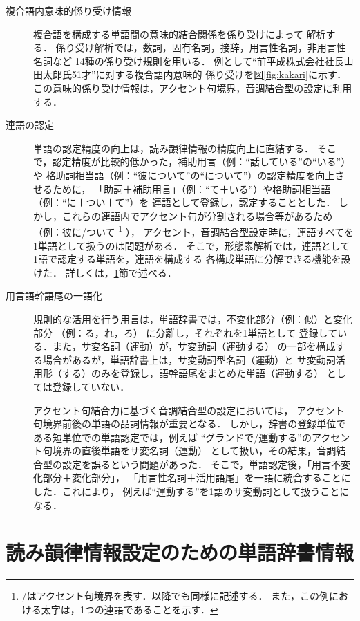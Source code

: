 \begin{description}
\item[複合語内意味的係り受け情報]
複合語を構成する単語間の意味的結合関係を係り受けによって
解析する\cite{Miyazaki2}．
係り受け解析では，数詞，固有名詞，接辞，用言性名詞，非用言性名詞など
14種の係り受け規則を用いる．
例として``前平成株式会社社長山田太郎氏51才''に対する複合語内意味的
係り受けを図\ref{fig:kakari}に示す．
この意味的係り受け情報は，アクセント句境界，音調結合型の設定に利用する．
\item[連語の認定]
単語の認定精度の向上は，読み韻律情報の精度向上に直結する．
そこで，認定\mbox{精度が比較的低かった，補助用言（例：``話している''の``いる''）や}
格助詞相当語（例：``彼について''の``について''）の認定精度を向上させるために，
「助詞＋補助用言」（例：``て＋いる''）や格助詞相当語（例：``に＋つい＋て''）を
連語として登録し，認定することとした．
しかし，これらの連語内でアクセント句が分割される場合等があるため
（例：彼{\dg に}/{\dg ついて}
\footnote{/はアクセント句境界を表す．以降でも同様に記述する．
また，この例における太字は，1つの連語であることを示す．}
），
アクセント，音調結合型設定時に，連語すべてを1単語として扱うのは問題がある．
そこで，形態素解析では，連語として1語で認定する単語を，連語を構成する
各構成単語に分解できる機能を設けた．
詳しくは，\ref{sec:dic}節で述べる．
\item[用言語幹語尾の一語化]
規則的な活用を行う用言は，単語辞書では，不変化部分（例：似）と変化部分
（例：る，れ，ろ）
に分離し，それぞれを1単語として
登録している．また，サ変名詞（運動）が，サ変動詞（運動する）
の一部を構成する場合があるが，単語辞書上は，サ変動詞型名詞（運動）と
サ変動詞活用形（する）のみを登録し，語幹語尾をまとめた単語（運動する）
としては登録していない．

アクセント句結合力に基づく音調結合型の設定においては，
アクセント句境界前後の単語の品詞情報が重要となる．
しかし，辞書の登録単位である短単位での単語認定では，例えば
``グランドで/運動する''のアクセント句境界の直後単語をサ変名詞（運動）
として扱い，その結果，音調結合型の設定を誤るという問題があった．
そこで，単語認定後，「用言不変化部分＋変化部分」，
「用言性名詞＋活用語尾」を一語に統合することにした．これにより，
例えば``運動する''を1語のサ変動詞として扱うことになる．
\end{description}

\vspace{3mm}
\section{読み韻律情報設定のための単語辞書情報}\label{sec:dic}

